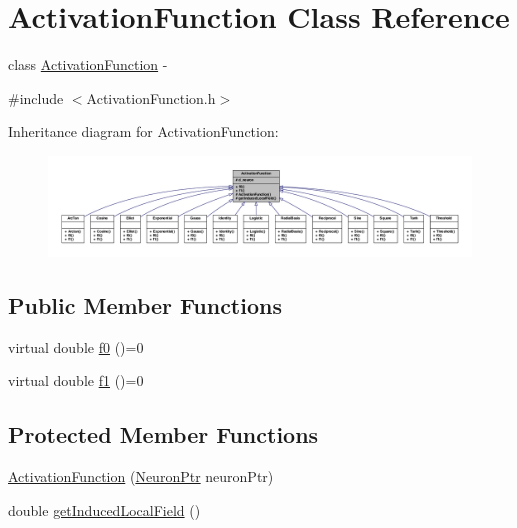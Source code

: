 \hypertarget{class_activation_function}{
\section{ActivationFunction Class Reference}
\label{class_activation_function}
}


class \hyperlink{class_activation_function}{ActivationFunction} -\/  




{\ttfamily \#include $<$ActivationFunction.h$>$}



Inheritance diagram for ActivationFunction:
\nopagebreak
\begin{figure}[H]
\begin{center}
\leavevmode
\includegraphics[width=400pt]{class_activation_function__inherit__graph}
\end{center}
\end{figure}
\subsection*{Public Member Functions}
\begin{DoxyCompactItemize}
\item 
virtual double \hyperlink{class_activation_function_a801deb6a372121fe110de1f79f93f1c6}{f0} ()=0
\item 
virtual double \hyperlink{class_activation_function_aa5a0a713bc1080ab5d5ae3632a08b08e}{f1} ()=0
\end{DoxyCompactItemize}
\subsection*{Protected Member Functions}
\begin{DoxyCompactItemize}
\item 
\hyperlink{class_activation_function_aebbc56ae5a7ff79e5d843034f6d7dc4f}{ActivationFunction} (\hyperlink{_a_m_o_r_e_8h_ac1ea936c2c7728eb382278131652fef4}{NeuronPtr} neuronPtr)
\item 
double \hyperlink{class_activation_function_a72f5e70051e79c0e19318ba1b9bb77ec}{getInducedLocalField} ()
\end{DoxyCompactItemize}
